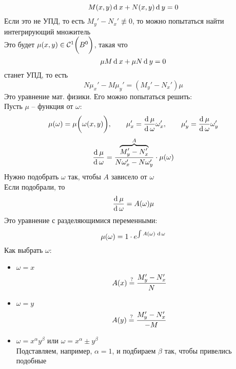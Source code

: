 $$ M(x, y) \di x + N(x, y) \di y = 0 $$
Если это не УПД, то есть $ M_y' - N_x' \not\equiv 0 $, то можно попытаться найти интегрирующий множитель \\
Это будет $ \mu(x ,y) \in \Cont[1]{B^0} $, такая что
$$ \mu M\di x + \mu N \di y = 0 $$
станет УПД, то есть
$$ N\mu_x' - M\mu_y' = (M_y' - N_x')\mu $$
Это уравнение мат. физики. Его можно попытаться решить: \\
Пусть $ \mu $ -- функция от $ \omega $:
$$ \mu(\omega) = \mu \bigg( \omega(x, y) \bigg), \qquad \mu_x' = \frac{\di \mu}{\di \omega}\omega_x', \qquad \mu_y' = \frac{\di \mu}{\di \omega}\omega_y' $$
$$ \frac{\di \mu}{\di \omega} = \frac{\overbrace{M_y' - N_x'}^A}{N\omega_x' - N\omega_y'} \cdot \mu(\omega) $$
Нужно подобрать $ \omega $ так, чтобы $ A $ зависело от $ \omega $ \\
Если подобрали, то
$$ \frac{\di\mu}{\di\omega} = A(\omega)\mu $$
Это уравнение с разделяющимися переменными:
$$ \mu(\omega) = 1 \cdot e^{\uint[\omega]{A(\omega)}} $$
Как выбрать $ \omega $:
\begin{itemize}
	\item $ \omega = x $
    $$ A(x) \iseq \frac{M_y' - N_x'}N $$
    \item $ \omega = y $
    $$ A(y) \iseq \frac{M_y' - N_x'}{-M} $$
    \item $ \omega = x^\alpha y^\beta $ или $ \omega = x^\alpha \pm y^\beta $ \\
    Подставляем, например, $ \alpha = 1 $, и подбираем $ \beta $ так, чтобы привелись подобные
\end{itemize}

